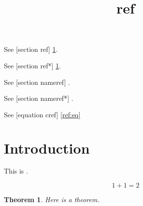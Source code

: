 \documentclass{amsart}
\title{ref}
\newtheorem{theorem}{Theorem}
\begin{document}
\maketitle

See [section ref] \ref{sec:intro}.

See [section ref*] \ref*{sec:intro}.

See [section nameref] .

See [section nameref*] .

See [equation cref] \eqref{ref:eq}

\section{Introduction}
\label{sec:intro}

This is .

\begin{equation}
\label{ref:eq}
1 + 1 = 2
\end{equation}

\begin{theorem}\label{thm:1}
Here is a theorem.
\end{theorem}
\end{document}
